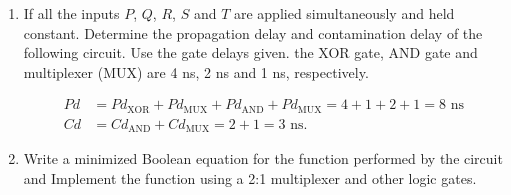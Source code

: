 \documentclass{zc-ust-hw}
\begin{document}
\maketitle

\begin{enumerate}

  \item If all the inputs $P$, $Q$, $R$, $S$ and $T$ are applied simultaneously and held
    constant. Determine the propagation delay and contamination delay of the
    following circuit. Use the gate delays given. the XOR gate, AND gate and
    multiplexer (MUX) are 4 ns, 2 ns and 1 ns, respectively. 

    \begin{sol}
      \begin{align}
        Pd &= Pd_{\text{XOR}} + Pd_{\text{MUX}} + Pd_{\text{AND}} + Pd_{\text{MUX}} = 4 + 1 + 2 + 1 = 8 \text{ ns} \\
        Cd &= Cd_{\text{AND}} + Cd_{\text{MUX}} = 2 + 1 = 3 \text{ ns}
      .\end{align}
    \end{sol}

  \item Write a minimized Boolean equation for the function performed by the
    circuit and Implement the function using a 2:1 multiplexer and other logic
    gates. 


\end{enumerate}
\end{document}
